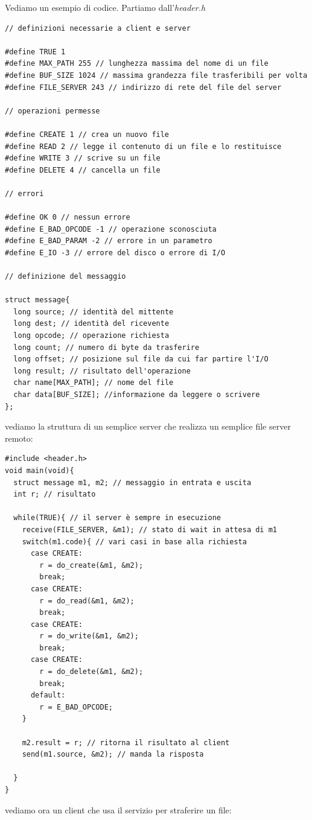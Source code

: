 \documentclass[a4paper,12pt, oneside]{book}
\begin{document}
Vediamo un esempio di codice. Partiamo dall'\textit{header.h}
\begin{verbatim}
// definizioni necessarie a client e server 

#define TRUE 1
#define MAX_PATH 255 // lunghezza massima del nome di un file
#define BUF_SIZE 1024 // massima grandezza file trasferibili per volta
#define FILE_SERVER 243 // indirizzo di rete del file del server

// operazioni permesse 

#define CREATE 1 // crea un nuovo file
#define READ 2 // legge il contenuto di un file e lo restituisce
#define WRITE 3 // scrive su un file
#define DELETE 4 // cancella un file

// errori

#define OK 0 // nessun errore
#define E_BAD_OPCODE -1 // operazione sconosciuta
#define E_BAD_PARAM -2 // errore in un parametro
#define E_IO -3 // errore del disco o errore di I/O

// definizione del messaggio

struct message{
  long source; // identità del mittente
  long dest; // identità del ricevente
  long opcode; // operazione richiesta
  long count; // numero di byte da trasferire
  long offset; // posizione sul file da cui far partire l'I/O
  long result; // risultato dell'operazione
  char name[MAX_PATH]; // nome del file
  char data[BUF_SIZE]; //informazione da leggere o scrivere
};
\end{verbatim}
\newpage
vediamo la struttura di un semplice server che realizza un semplice file server remoto:
\begin{verbatim}
#include <header.h>
void main(void){
  struct message m1, m2; // messaggio in entrata e uscita
  int r; // risultato
  
  while(TRUE){ // il server è sempre in esecuzione
    receive(FILE_SERVER, &m1); // stato di wait in attesa di m1
    switch(m1.code){ // vari casi in base alla richiesta
      case CREATE: 
        r = do_create(&m1, &m2);
        break;
      case CREATE: 
        r = do_read(&m1, &m2);
        break;
      case CREATE: 
        r = do_write(&m1, &m2);
        break;
      case CREATE: 
        r = do_delete(&m1, &m2);
        break;
      default:
        r = E_BAD_OPCODE;
    }
    
    m2.result = r; // ritorna il risultato al client
    send(m1.source, &m2); // manda la risposta
    
  }
}  
\end{verbatim}
\newpage
vediamo ora un client che usa il servizio per straferire un file:
\end{document}
